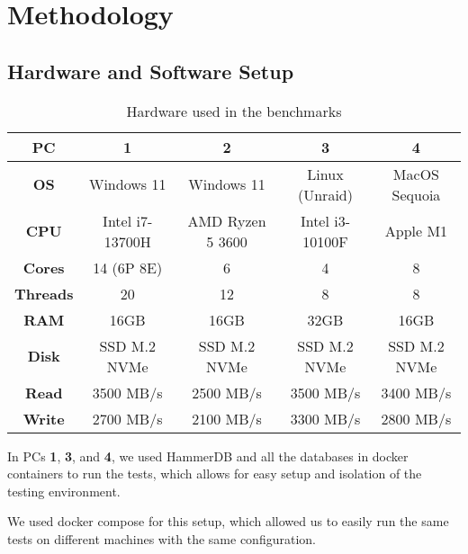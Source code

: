 \section{Methodology}
\label{sec:methodology}

\pagebreak

\subsection{Hardware and Software Setup}
\label{sec:hardware-software-setup}

\begin{table}[h!]
    \centering
    \begin{tabular}{|c|c|c|c|c|}
        \hline
        \textbf{PC}      & \textbf{1}      & \textbf{2}       & \textbf{3}      & \textbf{4}    \\
        \hline
        \textbf{OS}      & Windows 11      & Windows 11       & Linux (Unraid)  & MacOS Sequoia \\
        \hline
        \textbf{CPU}     & Intel i7-13700H & AMD Ryzen 5 3600 & Intel i3-10100F & Apple M1      \\
        \hline
        \textbf{Cores}   & 14 (6P 8E)      & 6                & 4               & 8             \\
        \hline
        \textbf{Threads} & 20              & 12               & 8               & 8             \\
        \hline
        \textbf{RAM}     & 16GB            & 16GB             & 32GB            & 16GB          \\
        \hline
        \textbf{Disk}    & SSD M.2 NVMe    & SSD M.2 NVMe     & SSD M.2 NVMe    & SSD M.2 NVMe  \\
        \hline
        \textbf{Read}    & 3500 MB/s       & 2500 MB/s        & 3500 MB/s       & 3400 MB/s     \\
        \hline
        \textbf{Write}   & 2700 MB/s       & 2100 MB/s        & 3300 MB/s       & 2800 MB/s     \\
        \hline
    \end{tabular}
    \caption{Hardware used in the benchmarks}
    \label{t,ab:hardware-setup}
\end{table}

In PCs \textbf{1}, \textbf{3}, and \textbf{4}, we used HammerDB and all the databases in docker containers to run the tests, which allows for easy setup and isolation of the testing environment.

We used docker compose for this setup, which allowed us to easily run the same tests on different machines with the same configuration.

